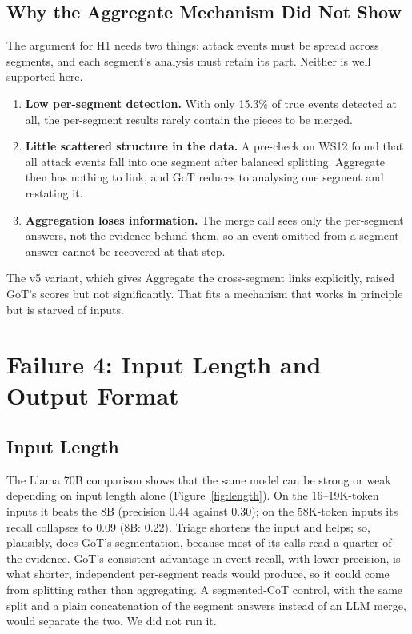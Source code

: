 \subsection{Why the Aggregate Mechanism Did Not Show}
\label{sec:disc-mechanism}
The argument for H1 needs two things: attack events must be spread across segments, and each segment's analysis must retain its part. Neither is well supported here.
\begin{enumerate}
\item \textbf{Low per-segment detection.} With only 15.3\% of true events detected at all, the per-segment results rarely contain the pieces to be merged.
\item \textbf{Little scattered structure in the data.} A pre-check on WS12 found that all attack events fall into one segment after balanced splitting. Aggregate then has nothing to link, and GoT reduces to analysing one segment and restating it.
\item \textbf{Aggregation loses information.} The merge call sees only the per-segment answers, not the evidence behind them, so an event omitted from a segment answer cannot be recovered at that step.
\end{enumerate}
The v5 variant, which gives Aggregate the cross-segment links explicitly, raised GoT's scores but not significantly. That fits a mechanism that works in principle but is starved of inputs.

\section{Failure 4: Input Length and Output Format}
\subsection{Input Length}
The Llama 70B comparison shows that the same model can be strong or weak depending on input length alone (Figure~\ref{fig:length}). On the 16--19K-token inputs it beats the 8B (precision 0.44 against 0.30); on the 58K-token inputs its recall collapses to 0.09 (8B: 0.22). Triage shortens the input and helps; so, plausibly, does GoT's segmentation, because most of its calls read a quarter of the evidence. GoT's consistent advantage in event recall, with lower precision, is what shorter, independent per-segment reads would produce, so it could come from splitting rather than aggregating. A segmented-CoT control, with the same split and a plain concatenation of the segment answers instead of an LLM merge, would separate the two. We did not run it.

